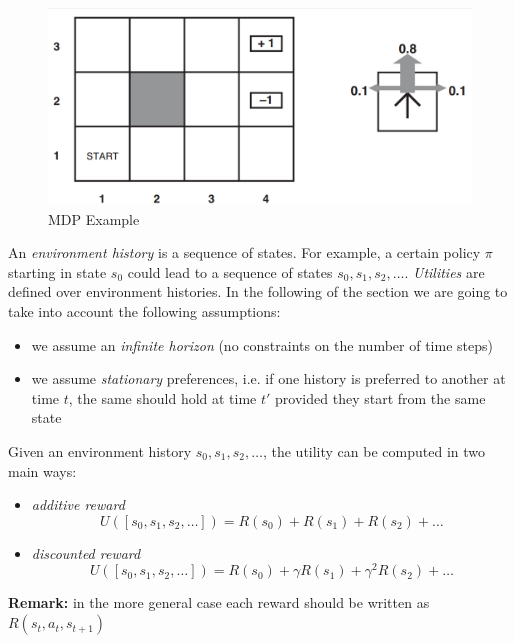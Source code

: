 \begin{figure}
    \centering
    \includegraphics[width=\textwidth]{images/mdpExample.png}
    \caption{MDP Example}
    \label{fig:mdpExample}
\end{figure}

An \textit{environment history} is a sequence of states. For example, a certain policy $\pi$ starting in state $s_0$ could lead to a sequence of states $s_0, s_1, s_2, \hdots$. \textit{Utilities} are defined over environment histories. In the following of the section we are going to take into account the following assumptions:
\begin{itemize}
    \item we assume an \textit{infinite horizon} (no constraints on the number of time steps)
    
    \item we assume \textit{stationary} preferences, i.e. if one history is preferred to another at time $t$, the same should hold at time $t'$ provided they start from the same state
\end{itemize}

Given an environment history $s_0, s_1, s_2, \hdots$, the utility can be computed in two main ways:
\begin{itemize}
    \item \textit{additive reward}
    \begin{equation}
        U([s_0, s_1, s_2, \hdots]) = R(s_0) + R(s_1) + R(s_2) + \hdots
    \end{equation}
    \item \textit{discounted reward}
    \begin{equation}
        U([s_0, s_1, s_2, \hdots]) = R(s_0) + \gamma R(s_1) + \gamma^2 R(s_2) + \hdots
    \end{equation}
\end{itemize}

\textbf{Remark:} in the more general case each reward should be written as $R(s_t, a_t, s_{t+1})$ \newline


